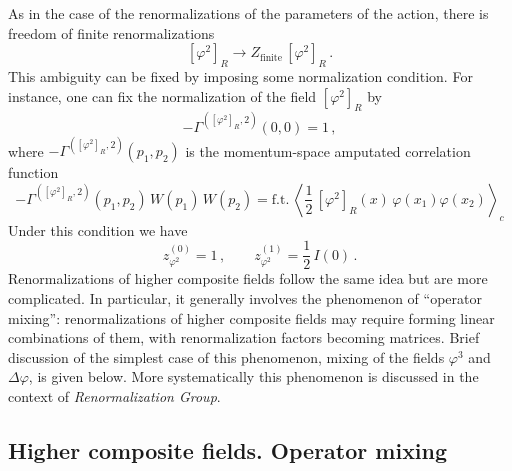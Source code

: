 As in the case of the renormalizations of the parameters of the action, there
is freedom of finite renormalizations
\[
[\varphi^2]_R\to Z_{\text{finite}}\,[\varphi^2]_R\,.
\]
This ambiguity can be fixed by imposing some normalization condition. For
instance, one can fix the normalization of the field $[\varphi^2]_R$ by
\[
-\Gamma^{([\varphi^2]_R,2)}(0,0)=1\,,
\]
where $-\Gamma^{([\varphi^2]_R,2)}(p_1,p_2)$ is the momentum-space amputated
correlation function
\[
-\Gamma^{([\varphi^2]_R,2)}(p_1,p_2)\,W(p_1)\,W(p_2)=\text{f.t.}\,\left\langle\frac12\,[\varphi^2]_R(x)\,\varphi(x_1)\varphi(x_2)\right\rangle_c
\]
Under this condition we have
\[
z^{(0)}_{\varphi^2}=1\,,\qquad z^{(1)}_{\varphi^2}=\frac12\,I(0)\,.
\]
Renormalizations of higher composite fields follow the same idea but are more
complicated. In particular, it generally involves the phenomenon of ``operator
mixing'': renormalizations of higher composite fields may require forming
linear combinations of them, with renormalization factors becoming matrices.
Brief discussion of the simplest case of this phenomenon, mixing of the fields
$\varphi^3$ and $\Delta\varphi$, is given below. More systematically this
phenomenon is discussed in the context of \emph{Renormalization Group}.

\subsection*{Higher composite fields. Operator mixing}

